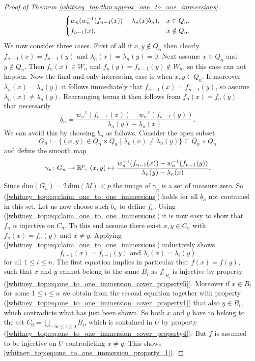 \begin{proof}[Proof of Theorem \ref{whitney_top:thm:approx_one_to_one_immersions}]
\[\begin{dcases}
        w_n(w_n^{-1}(f_{n-1}(x)) + \lambda_n(x)b_n), & x \in Q_n, \\
        f_{n-1}(x), & x \notin Q_n.
    \end{dcases}
    \]
    We now consider three cases. First of all if $x,y \notin Q_n$ then clearly $f_{n-1}(x) = f_{n-1}(y) \text{ and } \lambda_n(x) = \lambda_n(y) = 0$. Next assume $x \in Q_n$ and $y \notin Q_n$. Then $f_n(x) \in W_n$ and $f_n(y) = f_{n-1}(y) \notin W_n$, so this case can not happen. Now the final and only interesting case is when $x,y \in Q_n$. If moreover $\lambda_n(x) = \lambda_n(y)$ it follows immediately that $f_{n-1}(x) = f_{n-1}(y)$, so assume $\lambda_n(x) \neq \lambda_n(y)$. Rearranging terms it then follows from $f_n(x) = f_n(y)$ that necessarily
    \[
    b_n = \frac{w_n^{-1}(f_{n-1}(x)) - w_n^{-1}(f_{n-1}(y))}{\lambda_n(y) - \lambda_n(x)}.
    \]
    We can avoid this by choosing $b_n$ as follows. Consider the open subset 
    \[
    G_n := \{(x,y) \in Q_n \times Q_n \mid \lambda_n(x) \neq \lambda_n(y)\} \subseteq Q_n \times Q_n
    \]
    and define the smooth map 
    \[
    \gamma_n \colon G_n \to \mathbb{R}^p, \; (x,y) \mapsto \frac{w_n^{-1}(f_{n-1}(x)) - w_n^{-1}(f_{n-1}(y))}{\lambda_n(y) - \lambda_n(x)}.
    \]
    Since $\mathrm{dim}(G_n) = 2\,\mathrm{dim}(M) < p$ the image of $\gamma_n$ is a set of measure zero. So (\ref{whitney_top:eq:claim_one_to_one_immersions}) holds for all $b_n$ not contained in this set. Let us now choose such $b_n$ to define $f_n$. Using (\ref{whitney_top:eq:claim_one_to_one_immersions}) it is now easy to show that $f_n$ is injective on $C_n$. To this end assume there exist $x,y \in C_n$ with $f_n(x) = f_n(y)$ and $x \neq y$. Applying (\ref{whitney_top:eq:claim_one_to_one_immersions}) inductively shows 
    \[
    f_{i-1}(x) = f_{i-1}(y) \text{ and } \lambda_i(x) = \lambda_i(y)
    \]
    for all $1 \leq i \leq n$. The first equation implies in particular that $f(x) = f(y)$, such that $x$ and $y$ cannot belong to the same $B_i$ as $f|_{B_i}$ is injective by property (\ref{whitney_top:eq:one_to_one_immersion_cover_property5}). Moreover if $x \in B_i$ for some $1 \leq i \leq n$ we obtain from the second equation together with property (\ref{whitney_top:eq:one_to_one_immersion_cover_property1}) that also $y \in B_i$, which contradicts what has just been shown. So both $x$ and $y$ have to belong to the set $C_0 =  \bigcup_{-\infty \leq i \leq 0} B_i$, which is contained in $U$ by property (\ref{whitney_top:eq:one_to_one_immersion_cover_property4}). But $f$ is assumed to be injective on $U$ contradicting $x \neq y$. This shows \ref{whitney_top:eq:one_to_one_immersion_property_1}). 


\end{proof}
